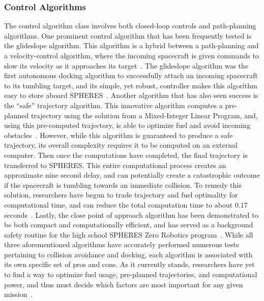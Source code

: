 \documentclass[journal, 10pt]{IEEEtran}
\begin{document}
\subsubsection{Control Algorithms}
The control algorithm class involves both closed-loop controls and path-planning algorithms. One prominent control algorithm that has been frequently tested is the glideslope algorithm. This algorithm is a hybrid between a path-planning and a velocity-control algorithm, where the incoming spacecraft is given commands to slow its velocity as it approaches its target~\cite{SPHERES_form, SPHERES_micro, dist, virt_sim}. The glideslope algorithm was the first autonomous docking algorithm to successfully attach an incoming spacecraft to its tumbling target, and its simple, yet robust, controller makes this algorithm easy to store aboard SPHERES~\cite{SPHERES_micro}. Another algorithm that has also seen success is the ``safe'' trajectory algorithm. This innovative algorithm computes a pre-planned trajectory using the solution from a Mixed-Integer Linear Program, and, using this pre-computed trajectory, is able to optimize fuel and avoid incoming obstacles~\cite{SPHERES_micro}. However, while this algorithm is guaranteed to produce a safe trajectory, its overall complexity requires it to be computed on an external computer. Then once the computations have completed, the final trajectory is transferred to SPHERES. This entire computational process creates an approximate nine second delay, and can potentially create a catastrophic outcome if the spacecraft is tumbling towards an immediate collision. To remedy this solution, researchers have begun to trade trajectory and fuel optimality for computational time, and can reduce the total computation time to about $0.17$ seconds~\cite{SPHERES_micro}. Lastly, the close point of approach algorithm has been demonstrated to be both compact and computationally efficient, and has served as a background safety routine for the high school SPHERES Zero Robotics program~\cite{virt_sim}. While all three aforementioned algorithms have accurately performed numerous tests pertaining to collision avoidance and docking, each algorithm is associated with its own specific set of pros and cons. As it currently stands, researchers have yet to find a way to optimize fuel usage, pre-planned trajectories, and computational power, and thus must decide which factors are most important for any given mission~\cite{SPHERES_form, SPHERES_micro, dist, virt_sim}.
\end{document}
